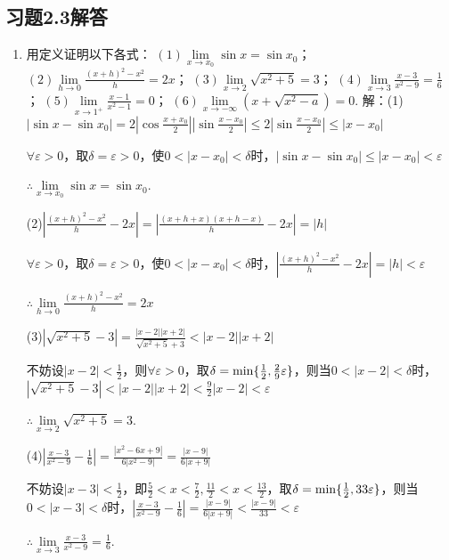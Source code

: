 \documentclass[12pt,UTF8]{ctexart}
\begin{document}
\subsection{习题2.3解答}
\begin{enumerate}
\item 用定义证明以下各式：
\newline
$(1)\lim\limits_{x\rightarrow x_0}\sin x=\sin x_0$；
\newline
$(2)\lim\limits_{h\rightarrow0}\frac{(x+h)^2-x^2}h=2x$；
\newline
$(3)\lim\limits_{x\rightarrow2}\sqrt{x^2+5}=3$；
\newline
$(4)\lim\limits_{x\rightarrow3}\frac{x-3}{x^2-9}=\frac16$；
\newline
$(5)\lim\limits_{x\rightarrow1^+}\frac{x-1}{x^2-1}=0$；
\newline
$(6)\lim\limits_{x\rightarrow-\infty}(x+\sqrt{x^2-a})=0$.
\newline
解：(1)$|\sin x-\sin x_0|=2|\cos\frac{x+x_0}2||\sin\frac{x-x_0}2|\leq2|\sin\frac{x-x_0}2|\leq|x-x_0|$

$\forall\varepsilon>0$，取$\delta=\varepsilon>0$，使$0<|x-x_0|<\delta$时，$|\sin x-\sin x_0|\leq|x-x_0|<\varepsilon$

$\therefore\lim\limits_{x\rightarrow x_0}\sin x=\sin x_0$.

(2)$|\frac{(x+h)^2-x^2}h-2x|=|\frac{(x+h+x)(x+h-x)}h-2x|=|h|$

$\forall\varepsilon>0$，取$\delta=\varepsilon>0$，使$0<|x-x_0|<\delta$时，$|\frac{(x+h)^2-x^2}h-2x|=|h|<\varepsilon$

$\therefore\lim\limits_{h\rightarrow0}\frac{(x+h)^2-x^2}h=2x$

(3)$|\sqrt{x^2+5}-3|=\frac{|x-2||x+2|}{\sqrt{x^2+5}+3}<|x-2||x+2|$

不妨设$|x-2|<\frac12$，则$\forall\varepsilon>0$，取$\delta={\rm min}\{\frac12,\frac29\varepsilon\}$，则当$0<|x-2|<\delta$时，$|\sqrt{x^2+5}-3|<|x-2||x+2|<\frac92|x-2|<\varepsilon$

$\therefore\lim\limits_{x\rightarrow2}\sqrt{x^2+5}=3$.

(4)$|\frac{x-3}{x^2-9}-\frac16|=\frac{|x^2-6x+9|}{6|x^2-9|}=\frac{|x-9|}{6|x+9|}$

不妨设$|x-3|<\frac12$，即$\frac52<x<\frac72,\frac{11}2<x<\frac{13}2$，取$\delta={\rm min}\{\frac12,33\varepsilon\}$，则当$0<|x-3|<\delta$时，$|\frac{x-3}{x^2-9}-\frac16|=\frac{|x-9|}{6|x+9|}<\frac{|x-9|}{33}<\varepsilon$

$\therefore\lim\limits_{x\rightarrow3}\frac{x-3}{x^2-9}=\frac16$.


\end{enumerate}
\end{document}
